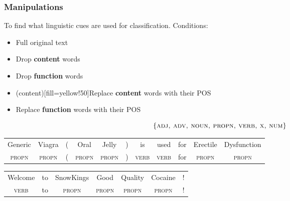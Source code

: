 \documentclass[t,xcolor={svgnames,table}]{beamer}
\begin{document}
\begin{frame}
	\frametitle{Manipulations}
	
	To find what linguistic cues are used for classification.
	\pause
	Conditions:
	\vfill
	
	\begin{itemize}\setlength\itemsep{1em}
	    \item Full original text
	\end{itemize}
	\vspace{1em}
	
	\begin{minipage}{.35\textwidth}
	\begin{itemize}\setlength\itemsep{1em}
		\item Drop \textbf{content} words
		\item Drop \textbf{function} words
	\end{itemize}
	\end{minipage}
	\begin{minipage}{.59\textwidth}
	\begin{itemize}\setlength\itemsep{1em}
		\item {}(content)[fill=yellow!50]{Replace \textbf{content} words with their POS}
		\item Replace \textbf{function} words with their POS
	\end{itemize}
	\end{minipage}
	\vfill
	
    \[\{\textsc{adj, adv, noun, propn, verb, x, num}\}\]
	\vfill
	\pause
	
	{\color{green}
	\setlength{\tabcolsep}{2.3pt}
	\begin{tabular}{ccccccccccc}
	Generic&Viagra&(&Oral&Jelly&)&is&used&for&Erectile&Dysfunction\\
	\rowcolor{yellow!50}
	\small\textsc{propn} & \small\textsc{propn} &(& \small\textsc{propn} & \small\textsc{propn} &)& \small\textsc{verb} & \small\textsc{verb} & for & \small\textsc{propn} & \small\textsc{propn}
	\end{tabular}}
	\vfill
	\pause
	
	{\color{red}
	\setlength{\tabcolsep}{9.5pt}
	\begin{tabular}{ccccccc}
	Welcome&to&SnowKings&Good&Quality&Cocaine&!\\
	\rowcolor{yellow!50}
	\small\textsc{verb} & to & \small\textsc{propn} & \small\textsc{propn} & \small\textsc{propn} & \small\textsc{propn} & !
	\end{tabular}}
\end{frame}
\end{document}
